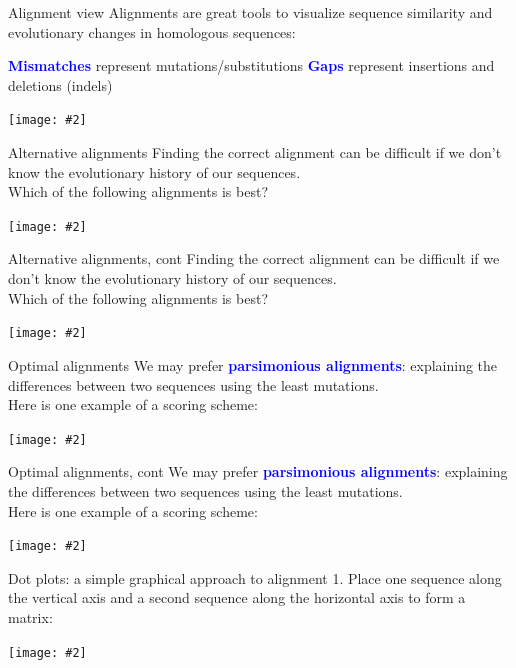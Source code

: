 \documentclass{beamer}
\renewcommand{\c}[1]{\begin{center}#1\end{center}}
\newcommand{\blu}[1]{\textcolor{blue}{\textbf{#1}}}
\newcommand{\gr}[2][.95]{\c{\texttt{[image: \#2]}}}
\begin{document}
\begin{frame}{Alignment view}
Alignments are great tools to visualize sequence similarity and evolutionary changes in homologous sequences:
\begin{outline}
\1 \blu{Mismatches} represent mutations/substitutions
\2 \blu{Gaps} represent insertions and deletions (indels)
\gr{l3_figs/s14_alignment.png}
\end{outline}
\end{frame}

\begin{frame}{Alternative alignments}
Finding the correct alignment can be difficult if we don't know the evolutionary history of our sequences.\\
\bigskip
Which of the following alignments is best?
\gr{l3_figs/s15_alt_alignments.png}
\end{frame}

\begin{frame}{Alternative alignments, cont}
Finding the correct alignment can be difficult if we don't know the evolutionary history of our sequences.\\
\bigskip
Which of the following alignments is best?
\gr{l3_figs/s16_alt_alignments.png}
\end{frame}

\begin{frame}{Optimal alignments}
We may prefer \blu{parsimonious alignments}: explaining the differences between two sequences using the least mutations.\\
\bigskip
Here is one example of a scoring scheme: \gr{l3_figs/s17_alt_alignments.png}
\tiny {}
\end{frame}

\begin{frame}{Optimal alignments, cont}
We may prefer \blu{parsimonious alignments}: explaining the differences between two sequences using the least mutations.\\
\bigskip
Here is one example of a scoring scheme: \gr{l3_figs/s18_alt_alignments.png}\tiny {}
\end{frame}

\begin{frame}{Dot plots: a simple graphical approach to alignment}
1. Place one sequence along the vertical axis and a second sequence along the horizontal axis to form a matrix:
\gr[.5]{l3_figs/s19_matrix.png}
\end{frame}
\end{document}
